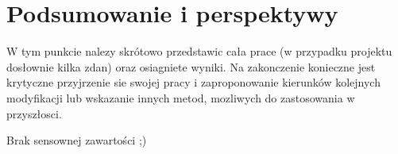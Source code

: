 \chapter{Podsumowanie i perspektywy}

W tym punkcie nalezy skrótowo przedstawic cała prace (w przypadku projektu dosłownie
kilka zdan) oraz osiagniete wyniki. Na zakonczenie konieczne jest krytyczne przyjrzenie sie
swojej pracy i zaproponowanie kierunków kolejnych modyfikacji lub wskazanie innych metod,
mozliwych do zastosowania w przyszłosci.


Brak sensownej zawartości ;)


